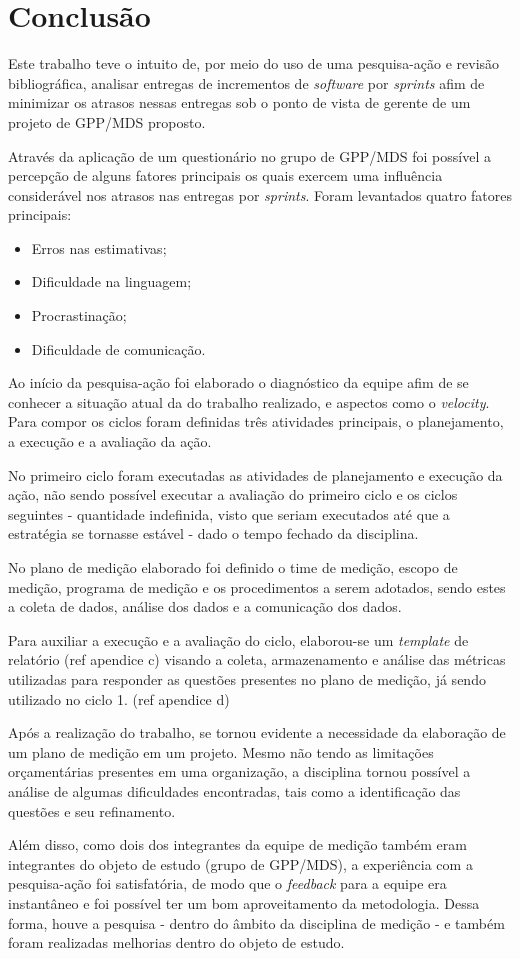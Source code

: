 \chapter{Conclusão}

Este trabalho teve o intuito de, por meio do uso de uma pesquisa-ação e revisão bibliográfica, analisar entregas de incrementos de \textit{software} por \textit{sprints} afim de minimizar os atrasos nessas entregas sob o ponto de vista de gerente de um projeto de GPP/MDS proposto.

Através da aplicação de um questionário no grupo de GPP/MDS foi possível a percepção de alguns fatores principais os quais exercem uma influência considerável nos atrasos nas entregas por \textit{sprints}. Foram levantados quatro fatores principais:

\begin{itemize}
  \item Erros nas estimativas;
  \item Dificuldade na linguagem;
  \item Procrastinação;
  \item Dificuldade de comunicação.
\end{itemize}

Ao início da pesquisa-ação foi elaborado o diagnóstico da equipe afim de se conhecer a situação atual da do trabalho realizado, e aspectos como o \textit{velocity}. Para compor os ciclos foram definidas três atividades principais, o planejamento, a execução e a avaliação da ação.

No primeiro ciclo foram executadas as atividades de planejamento e execução da ação, não sendo possível executar a avaliação do primeiro ciclo e os ciclos seguintes - quantidade indefinida, visto que seriam executados até que a estratégia se tornasse estável - dado o tempo fechado da disciplina.

No plano de medição elaborado foi definido o time de medição, escopo de medição, programa de medição e os procedimentos a serem adotados, sendo estes a coleta de dados, análise dos dados e a comunicação dos dados.

Para auxiliar a execução e a avaliação do ciclo, elaborou-se um \textit{template} de relatório (ref apendice c)  visando a coleta, armazenamento e análise das métricas utilizadas para responder as questões presentes no plano de medição, já sendo utilizado no ciclo 1. (ref apendice d)

Após a realização do trabalho, se tornou evidente a necessidade da elaboração de um plano de medição em um projeto. Mesmo não tendo as limitações orçamentárias presentes em uma organização, a disciplina tornou possível a análise de algumas dificuldades encontradas, tais como a identificação das questões e seu refinamento.

Além disso, como dois dos integrantes da equipe de medição também eram integrantes do objeto de estudo (grupo de GPP/MDS), a experiência com a pesquisa-ação foi satisfatória, de modo que o \textit{feedback} para a equipe era instantâneo e foi possível ter um bom aproveitamento da metodologia. Dessa forma, houve a pesquisa - dentro do âmbito da disciplina de medição - e também foram realizadas melhorias dentro do objeto de estudo.
